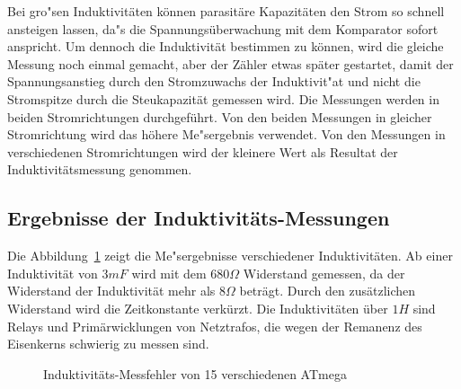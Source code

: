 Bei gro"sen Induktivit\"aten k\"onnen parasit\"are Kapazit\"aten den Strom so schnell ansteigen lassen, da"s
die Spannungs\"uberwachung mit dem Komparator sofort anspricht. Um dennoch die Induktivit\"at bestimmen zu
k\"onnen, wird die gleiche Messung noch einmal gemacht, aber der Z\"ahler etwas sp\"ater gestartet, damit
der Spannungsanstieg durch den Stromzuwachs der Induktivit"at und nicht die Stromspitze durch die
Steukapazit\"at gemessen wird.
Die Messungen werden in beiden Stromrichtungen durchgef\"uhrt.
Von den beiden Messungen in gleicher Stromrichtung wird das h\"ohere Me"sergebnis verwendet.
Von den Messungen in verschiedenen Stromrichtungen wird der kleinere Wert als Resultat der Induktivit\"atsmessung genommen.

\subsection{Ergebnisse der Induktivit\"ats-Messungen}
Die Abbildung~\ref{fig:Induct328p} zeigt die Me"sergebnisse verschiedener Induktivit\"aten.
Ab einer Induktivit\"at von \(3 mF\) wird mit dem \(680 \Omega\) Widerstand gemessen, da der Widerstand
der Induktivit\"at mehr als \(8 \Omega\) betr\"agt. Durch den zus\"atzlichen Widerstand wird die
Zeitkonstante verk\"urzt.
Die Induktivit\"aten \"uber \(1 H\) sind Relays und Prim\"arwicklungen von Netztrafos, die wegen
der Remanenz des Eisenkerns schwierig zu messen sind.

\begin{figure}[H]
\centering

\caption{Induktivit\"ats-Messfehler von 15 verschiedenen ATmega}
\label{fig:Induct328p}
\end{figure}
